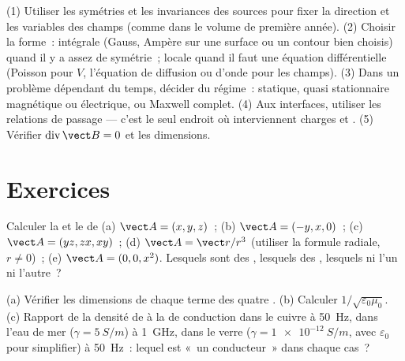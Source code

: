 \begin{method}\label{met:b2:maxwell-equations:method}
(1) Utiliser les symétries et les invariances des sources pour fixer la
direction et les variables des champs (comme dans le volume de première année).
(2) Choisir la forme~: intégrale (Gauss, Ampère sur une surface ou un contour bien
choisis) quand il y a assez de symétrie~; locale quand il faut une
équation différentielle (Poisson pour $V$, l'équation de diffusion ou d'onde
pour les champs). (3) Dans un problème dépendant du temps, décider du régime~:
statique, quasi stationnaire magnétique ou électrique, ou Maxwell complet. (4)
Aux interfaces, utiliser les relations de passage --- c'est le seul endroit
où interviennent charges et . (5) Vérifier
$\operatorname{div}\vect B = 0$ et les dimensions.
\end{method}

\section{Exercices}

\begin{exercise}[$\star$]\label{exo:b2:maxwell-equations:1}
Calculer la  et le  de (a) $\vect A = (x, y, z)$~; (b)
$\vect A = (-y, x, 0)$~; (c) $\vect A = (yz, zx, xy)$~; (d) $\vect A = \vect r/r^3$
(utiliser la formule radiale, $r \ne 0$)~; (e) $\vect A = (0, 0, x^2)$. Lesquels sont des
, lesquels des , lesquels ni l'un ni l'autre~?
\end{exercise}

\begin{exercise}[$\star$]\label{exo:b2:maxwell-equations:2}
(a) Vérifier les dimensions de chaque terme des quatre .
(b) Calculer $1/\sqrt{\varepsilon_0\mu_0}$. (c) Rapport de la densité de 
à la  de conduction dans le cuivre à \qty{50}{Hz}, dans
l'eau de mer ($\gamma = \qty{5}{S/m}$) à \qty{1}{GHz}, dans le verre ($\gamma =
\qty{1e-12}{S/m}$, avec $\varepsilon_0$ pour simplifier) à \qty{50}{Hz}~: lequel est
«~un conducteur~» dans chaque cas~?
\end{exercise}

